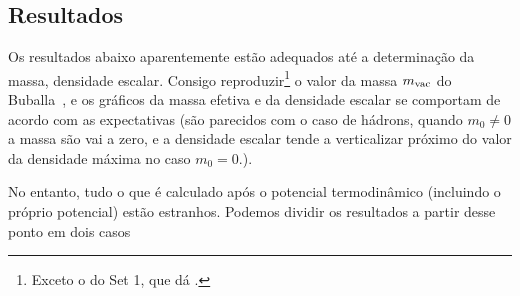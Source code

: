 \subsection{Resultados}

Os resultados abaixo aparentemente estão adequados até a determinação da massa, densidade escalar. Consigo reproduzir\footnote{Exceto o do Set 1, que dá .} o valor da massa $m_{\rm{vac}}$ do Buballa~\cite{Buballa1996}, e os gráficos da massa efetiva e da densidade escalar se comportam de acordo com as expectativas (são parecidos com o caso de hádrons, quando $m_0 \neq 0$ a massa são vai a zero, e a densidade escalar tende a verticalizar próximo do valor da densidade máxima no caso $m_0 = 0$.).

No entanto, tudo o que é calculado após o potencial termodinâmico (incluindo o próprio potencial) estão estranhos. Podemos dividir os resultados a partir desse ponto em dois casos
